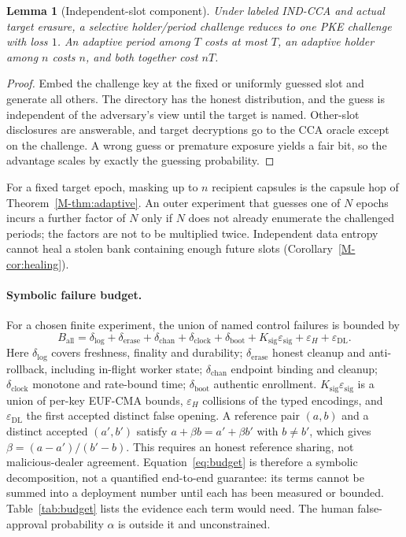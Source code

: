\documentclass[pdflatex,sn-mathphys-num]{sn-jnl}
\theoremstyle{plain}
\newtheorem{lemma}{Lemma}
\begin{document}
\begin{lemma}[Independent-slot component]\label{lem:slot}
Under labeled IND-CCA and actual target erasure, a selective holder/period challenge reduces to one PKE challenge with loss $1$. An adaptive period among $T$ costs at most $T$, an adaptive holder among $n$ costs $n$, and both together cost $nT$.
\end{lemma}
\begin{proof}
Embed the challenge key at the fixed or uniformly guessed slot and generate all others. The directory has the honest distribution, and the guess is independent of the adversary's view until the target is named. Other-slot disclosures are answerable, and target decryptions go to the CCA oracle except on the challenge. A wrong guess or premature exposure yields a fair bit, so the advantage scales by exactly the guessing probability.
\end{proof}

For a fixed target epoch, masking up to $n$ recipient capsules is the capsule hop of Theorem~\ref{M-thm:adaptive}. An outer experiment that guesses one of $N$ epochs incurs a further factor of $N$ only if $N$ does not already enumerate the challenged periods; the factors are not to be multiplied twice. Independent data entropy cannot heal a stolen bank containing enough future slots (Corollary~\ref{M-cor:healing}).

\paragraph{Symbolic failure budget.}
For a chosen finite experiment, the union of named control failures is bounded by
\begin{equation}\label{eq:budget}
 B_{\mathrm{all}}=\delta_{\mathrm{log}}+\delta_{\mathrm{erase}}+\delta_{\mathrm{chan}}+\delta_{\mathrm{clock}}+\delta_{\mathrm{boot}}+K_{\mathrm{sig}}\varepsilon_{\mathrm{sig}}+\varepsilon_H+\varepsilon_{\mathrm{DL}}.
\end{equation}
Here $\delta_{\mathrm{log}}$ covers freshness, finality and durability; $\delta_{\mathrm{erase}}$ honest cleanup and anti-rollback, including in-flight worker state; $\delta_{\mathrm{chan}}$ endpoint binding and cleanup; $\delta_{\mathrm{clock}}$ monotone and rate-bound time; $\delta_{\mathrm{boot}}$ authentic enrollment. $K_{\mathrm{sig}}\varepsilon_{\mathrm{sig}}$ is a union of per-key EUF-CMA bounds, $\varepsilon_H$ collisions of the typed encodings, and $\varepsilon_{\mathrm{DL}}$ the first accepted distinct false opening. A reference pair $(a,b)$ and a distinct accepted $(a',b')$ satisfy $a+\beta b=a'+\beta b'$ with $b\ne b'$, which gives $\beta=(a-a')/(b'-b)$. This requires an honest reference sharing, not malicious-dealer agreement. Equation~\eqref{eq:budget} is therefore a symbolic decomposition, not a quantified end-to-end guarantee: its terms cannot be summed into a deployment number until each has been measured or bounded. Table~\ref{tab:budget} lists the evidence each term would need. The human false-approval probability $\alpha$ is outside it and unconstrained.
\end{document}
